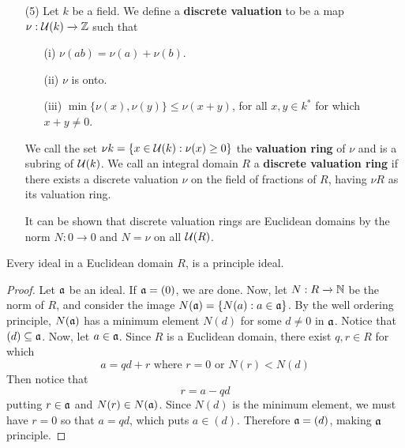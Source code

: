 \begin{example}
\begin{enumerate}
    \item[(5)] Let $k$ be a field. We define a  \textbf{discrete valuation}
      to be a map $\nu: \mathcal{U}(k) \xrightarrow{} \mathbb{Z}$ such that
      \begin{enumerate}
        \item[(i)] $\nu(ab)=\nu(a)+\nu(b)$.

        \item[(ii)] $\nu$ is onto.

        \item[(iii)] $\min{\{\nu(x),\nu(y)\}} \leq \nu(x+y)$, for all
          $x,y \in k^\ast$ for which  $x+y \neq 0$.
      \end{enumerate}
      We call the set $\nu{k}=\{x \in \mathcal{U}{(k)} : \nu(x) \geq 0\}$ the
      \textbf{valuation ring} of $\nu$ and is a subring of $\mathcal{U}{(k)}$. We
      call an integral domain  $R$ a  \textbf{discrete valuation ring} if
      there exists a discrete valuation $\nu$ on the field of fractions of
      $R$, having  $\nu{R}$ as its valuation ring.

      It can be shown that discrete valuation rings are Euclidean
      domains by the norm $N:0 \xrightarrow{} 0$ and $N=\nu$ on all
      $\mathcal{U}{(R)}$.
  \end{enumerate}
\end{example}

\begin{lemma}\label{lemma_6.1.1}
  Every ideal in a Euclidean domain $R$, is a principle ideal.
\end{lemma}
\begin{proof}
  Let $\mathfrak{a}$ be an ideal. If $\mathfrak{a}=(0)$, we are done. Now, let $N:R \xrightarrow{}
  \mathbb{N}$ be the norm of $R$, and consider the image $N(\mathfrak{a})=\{N(a) : a \in \mathfrak{a}\}$. By
  the well ordering principle, $N(\mathfrak{a})$ has a minimum element $N(d)$ for some
  $d \neq 0$ in $\mathfrak{a}$. Notice that  $(d) \subseteq \mathfrak{a}$. Now, let $a \in \mathfrak{a}$.
  Since $R$ is a Euclidean domain, there exist $q,r \in R$ for which
  \begin{equation*}
    a=qd+r \text{ where } r=0 \text{ or } N(r)<N(d)
  \end{equation*}
  Then notice that
  \begin{equation*}
    r=a-qd
  \end{equation*}
  putting $r \in \mathfrak{a}$ and  $N(r) \in N(\mathfrak{a})$. Since $N(d)$ is the minimum element,
  we must have $r=0$ so that  $a=qd$, which puts  $a \in (d)$. Therefore
  $\mathfrak{a}=(d)$, making $\mathfrak{a}$ principle.
\end{proof}

